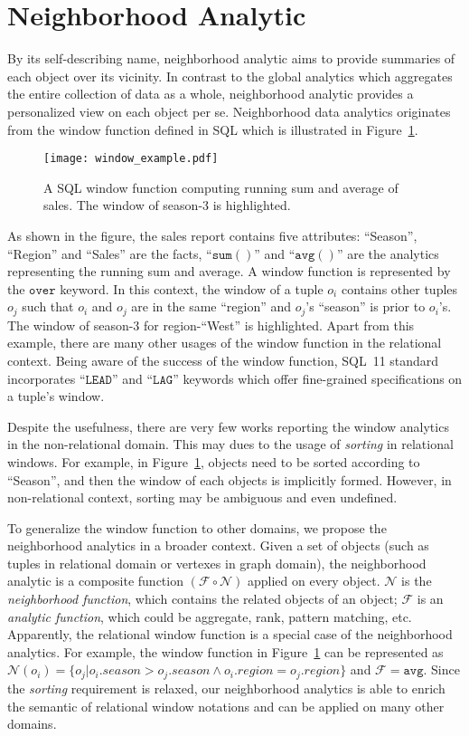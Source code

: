 \section{Neighborhood Analytic}
By its self-describing name, neighborhood analytic aims to provide
summaries of each object over its vicinity. In contrast to the global
analytics which aggregates the entire collection of data as a whole, neighborhood
analytic provides a personalized view on each object per se. Neighborhood
data analytics originates from the window function defined in  SQL which is
illustrated in Figure~\ref{fig:window}.

\begin{figure}[h]
\centering
\texttt{[image: window\_example.pdf]}
\caption{A SQL window function computing running sum and average of
sales. The window of season-3 is highlighted.} 
\label{fig:window}
\end{figure}

As shown in the figure, the sales report contains five attributes: 
``Season'', ``Region'' and ``Sales'' are the facts, ``$\mathtt{sum()}$'' and ``$\mathtt{avg()}$''
are the analytics representing the running sum and average. A window function
is represented by the $\mathtt{over}$ keyword. In this context, the window of a tuple $o_i$
contains other tuples $o_j$ such that $o_i$ and $o_j$ are in the same ``region'' and $o_j$'s ``season'' is
prior to $o_i$'s. The window of season-$3$ for region-``West'' is highlighted.
Apart from this example, there are many other 
usages of the window function in the relational context. 
Being aware of the success of the window function, 
SQL~11 standard incorporates ``$\mathtt{LEAD}$'' and ``$\mathtt{LAG}$'' 
keywords which offer fine-grained specifications on a tuple's window.

Despite the usefulness, there are very few works reporting the window
analytics in the non-relational domain. This may dues to the
usage of \emph{sorting} in relational windows. For example,
in Figure~\ref{fig:window},
objects need to be sorted according to ``Season'', and then the window of
each objects is implicitly formed. However, 
in non-relational context, sorting may be ambiguous and even undefined.

To generalize the window function to other domains, we propose the neighborhood
analytics in a broader context. Given a set of objects 
(such as tuples in relational domain or vertexes in graph domain),
the neighborhood analytic is a composite function
$(\mathcal{F} \circ \mathcal{N})$ applied on every object. $\mathcal{N}$
is the \emph{neighborhood function}, which contains the related objects of an object;
$\mathcal{F}$ is an \emph{analytic function}, which could be aggregate, rank,
pattern matching, etc.
Apparently, the relational window function is a special case of the
neighborhood analytics. For example, the window function in Figure~\ref{fig:window} 
can be represented as $\mathcal{N}(o_i)=\{o_j | o_i.season > o_j.season \wedge o_i.region = o_j.region\}$
and $\mathcal{F} = \mathtt{avg}$.
Since the \emph{sorting} requirement is relaxed, our neighborhood analytics is able to
enrich the semantic of relational window notations 
and can be applied on many other domains.